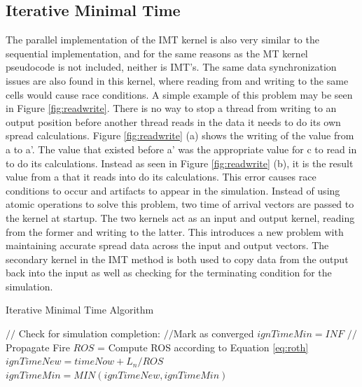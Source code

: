\subsection{Iterative Minimal Time}
The parallel implementation of the IMT kernel is also very similar to the sequential implementation, and for the same reasons as the MT kernel pseudocode is not included, neither is IMT's. The same data synchronization issues are also found in this kernel, where reading from and writing to the same cells would cause race conditions. A simple example of this problem may be seen in Figure \ref{fig:readwrite}. There is no way to stop a thread from writing to an output position before another thread reads in the data it needs to do its own spread calculations. Figure \ref{fig:readwrite} (a) shows the writing of the value from a to a'. The value that existed before a' was the appropriate value for c to read in to do its calculations. Instead as seen in Figure \ref{fig:readwrite} (b), it is the result value from a that it reads into do its calculations. This error causes race conditions to occur and artifacts to appear in the simulation. Instead of using atomic operations to solve this problem, two time of arrival vectors are passed to the kernel at startup. The two kernels act as an input and output kernel, reading from the former and writing to the latter. This introduces a new problem with maintaining accurate spread data across the input and output vectors. The secondary kernel in the IMT method is both used to copy data from the output back into the input as well as checking for the terminating condition for the simulation. 

\begin{algorithm}[H]
  \caption{Iterative Minimal Time Algorithm}
  \label{alg:IMT}
  \begin{algorithmic}
  \STATE $//$ Check for simulation completion:
  \STATE $//$Mark as converged
  \ENDIF
  \STATE $ignTimeMin = INF$
  \STATE $//$Propagate Fire
  \STATE $ROS$ = Compute ROS according to Equation \ref{eq:roth}
  \STATE $ignTimeNew = timeNow + L_n / ROS$
  \STATE $ignTimeMin = MIN(ignTimeNew, ignTimeMin)$
  \ENDFOR
  \ENDIF
  \ENDFOR
  \end{algorithmic}
\end{algorithm}

